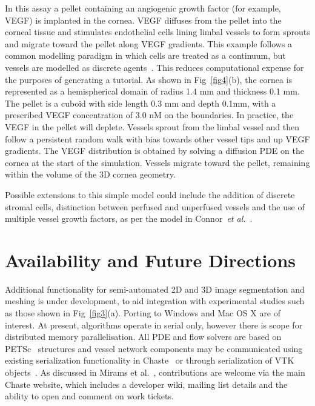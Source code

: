 \documentclass[10pt,letterpaper]{article}
\begin{document}
In this assay a pellet containing an angiogenic growth factor (for example, VEGF) is implanted in the cornea. VEGF diffuses from the pellet into the corneal tissue and stimulates endothelial cells lining limbal vessels to form sprouts and migrate toward the pellet along VEGF gradients. This example follows a common modelling paradigm in which cells are treated as a continuum, but vessels are modelled as discrete agents~\cite{Secomb2013}. This reduces computational expense for the purposes of generating a tutorial. As shown in Fig~\ref{fig4}(b), the cornea is represented as a hemispherical domain of radius 1.4 mm and thickness 0.1 mm. The pellet is a cuboid with side length 0.3 mm and depth 0.1mm, with a prescribed VEGF concentration of 3.0 nM on the boundaries. In practice, the VEGF in the pellet will deplete. Vessels sprout from the limbal vessel and then follow a persistent random walk with bias towards other vessel tips and up VEGF gradients. The VEGF distribution is obtained by solving a diffusion PDE on the cornea at the start of the simulation. Vessels migrate toward the pellet, remaining within the volume of the 3D cornea geometry.

Possible extensions to this simple model could include the addition of discrete stromal cells, distinction between perfused and unperfused vessels and the use of multiple vessel growth factors, as per the model in Connor~\emph{et al.}~\cite{Connor2015}.

\section*{Availability and Future Directions}

Additional functionality for semi-automated 2D and 3D image segmentation and meshing is under development, to aid integration with experimental studies such as those shown in Fig~\ref{fig3}(a). Porting to Windows and Mac OS X are of interest. At present, algorithms operate in serial only, however there is scope for distributed memory parallelisation. All PDE and flow solvers are based on PETSc~\cite{Balay2014} structures and vessel network components may be communicated using existing serialization functionality in Chaste~\cite{Harvey2015} or through serialization of VTK objects~\cite{Schroeder2003}. As discussed in Mirams et al.~\cite{Mirams2013}, contributions are welcome via the main Chaste website, which includes a developer wiki, mailing list details and the ability to open and comment on work tickets. 
\end{document}
